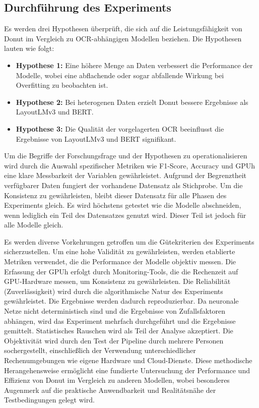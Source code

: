 \subsection{Durchführung des Experiments}
Es werden drei Hypothesen überprüft, die sich auf die Leistungsfähigkeit von Donut im Vergleich zu OCR-abhängigen Modellen beziehen. Die Hypothesen lauten wie folgt:
\begin{itemize}
    \item \textbf{Hypothese 1:} Eine höhere Menge an Daten verbessert die Performance der Modelle, wobei eine abflachende oder sogar abfallende Wirkung bei Overfitting zu beobachten ist.
    \item \textbf{Hypothese 2:} Bei heterogenen Daten erzielt Donut bessere Ergebnisse als LayoutLMv3 und BERT.
    \item \textbf{Hypothese 3:} Die Qualität der vorgelagerten OCR beeinflusst die Ergebnisse von LayoutLMv3 und BERT signifikant.
\end{itemize}

Um die Begriffe der Forschungsfrage und der Hypothesen zu operationalisieren wird durch die Auswahl spezifischer Metriken wie F1-Score, Accuracy und \ac{GPUh} eine klare Messbarkeit der Variablen gewährleistet. Aufgrund der Begrenztheit verfügbarer Daten fungiert der vorhandene Datensatz als Stichprobe. Um die Konsistenz zu gewährleisten, bleibt dieser Datensatz für alle Phasen des Experiments gleich. Es wird höchstens getestet wie die Modelle abschneiden, wenn lediglich ein Teil des Datensatzes genutzt wird. Dieser Teil ist jedoch für alle Modelle gleich. 

Es werden diverse Vorkehrungen getroffen um die Gütekriterien des Experiments sicherzustellen. Um eine hohe Validität zu gewährleisten, werden etablierte Metriken verwendet, die die Performance der Modelle objektiv messen. Die Erfassung der \ac{GPUh} erfolgt durch Monitoring-Tools, die die Rechenzeit auf GPU-Hardware messen, um Konsistenz zu gewährleisten. Die Reliabilität (Zuverlässigkeit) wird durch die algorithmische Natur des Experiments gewährleistet. Die Ergebnisse werden dadurch reproduzierbar. Da neuronale Netze nicht deterministisch sind und die Ergebnisse von Zufallsfaktoren abhängen, wird das Experiment mehrfach durchgeführt und die Ergebnisse gemittelt. Statistisches Rauschen wird als Teil der Analyse akzeptiert. Die Objektivität wird durch den Test der Pipeline durch mehrere Personen sochergestellt, einschließlich der Verwendung unterschiedlicher Rechenumgebungen wie eigene Hardware und Cloud-Dienste. Diese methodische Herangehensweise ermöglicht eine fundierte Untersuchung der Performance und Effizienz von Donut im Vergleich zu anderen Modellen, wobei besonderes Augenmerk auf die praktische Anwendbarkeit und Realitätsnähe der Testbedingungen gelegt wird.

